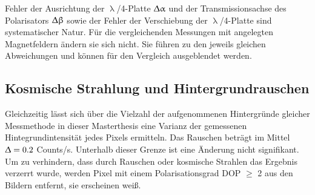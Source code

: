 Fehler der Ausrichtung der $\uplambda$/4-Platte $\Updelta \upalpha$ und der
Transmissionsachse des Polarisators $\Updelta \upbeta$ sowie der Fehler der
Verschiebung der $\uplambda$/4-Platte sind systematischer Natur. Für die
vergleichenden Messungen mit angelegten Magnetfeldern ändern sie sich nicht. Sie
führen zu den jeweils gleichen Abweichungen und können für den Vergleich
ausgeblendet werden. \subsection{Kosmische Strahlung und Hintergrundrauschen}
\label{Rauschen} Gleichzeitig lässt sich über die Vielzahl der aufgenommenen
Hintergründe gleicher Messmethode in dieser Masterthesis eine Varianz der
gemessenen Hintegrundintensität jedes Pixels ermitteln. Das Rauschen beträgt im
Mittel $\Updelta= \text{0.2}$ Counts/s. Unterhalb dieser Grenze ist eine
Änderung nicht signifikant.\\ Um zu verhindern, dass durch Rauschen oder
kosmische Strahlen das Ergebnis verzerrt wurde, werden Pixel mit einem
Polarisationsgrad DOP $\geq$ 2 aus den Bildern entfernt, sie erscheinen weiß.
